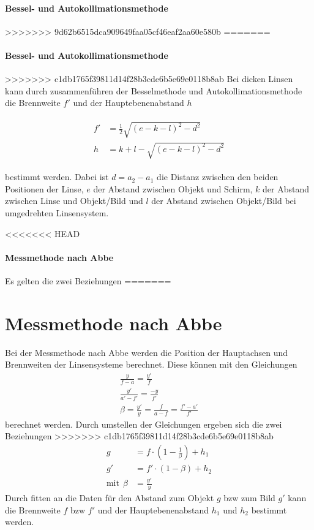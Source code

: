 \documentclass[11pt, a4paper]{article}
\begin{document}
    \paragraph{Bessel- und Autokollimationsmethode}
>>>>>>> 9d62b6515dca909649faa05cf46eaf2aa60e580b
=======
    \paragraph{Bessel- und Autokollimationsmethode}
>>>>>>> c1db1765f39811d14f28b3cde6b5e69e0118b8ab
    Bei dicken Linsen kann durch zusammenführen der Besselmethode und Autokollimationsmethode die Brennweite $f'$ und der Hauptebenenabstand $h$
    
    \begin{align} \begin{split} \label{eq:dicke}
        f' &= \frac{1}{2} \sqrt{(e-k-l)^2 - d^2} \\
        h &= k + l - \sqrt{(e-k-l)^2 - d^2} \end{split}
    \end{align}
        
    bestimmt werden. Dabei ist $d = a_2 - a_1$ die Distanz zwischen den beiden Positionen der Linse, $e$ der Abstand zwischen Objekt und Schirm, $k$ der Abstand zwischen Linse und Objekt/Bild und $l$ der Abstand zwischen Objekt/Bild bei umgedrehten Linsensystem.

<<<<<<< HEAD
    \paragraph{Messmethode nach Abbe}
    Es gelten die zwei Beziehungen
=======
    \section{Messmethode nach Abbe}
    Bei der Messmethode nach Abbe werden die Position der Hauptachsen und Brennweiten der Linsensysteme berechnet. Diese können mit den Gleichungen
    \begin{align}
        \frac{y}{f-a} = \frac{y'}{f} \\
        \frac{y'}{a'-f'} = \frac{-y}{f'} \\
        \beta = \frac{y'}{y} = \frac{f}{a-f} = \frac{f'-a'}{f'}
    \end{align}
    berechnet werden. Durch umstellen der Gleichungen ergeben sich die zwei Beziehungen
>>>>>>> c1db1765f39811d14f28b3cde6b5e69e0118b8ab
    \begin{align}
        g &= f \cdot \left(1 - \frac{1}{\beta}\right) + h_1 \label{eq:dicke1} \\
        g' &= f' \cdot (1 - \beta) + h_2 \label{eq:dicke2} \\
        \text{mit} \ \ \beta &= \frac{y'}{y}
    \end{align}
    Durch fitten an die Daten für den Abstand zum Objekt $g$ bzw zum Bild $g'$ kann die Brennweite $f$ bzw $f'$ und der Hauptebenenabstand $h_1$ und $h_2$ bestimmt werden.
\end{document}

